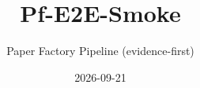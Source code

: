 \documentclass[11pt]{article}
\title{Pf-E2E-Smoke}
\author{Paper Factory Pipeline (evidence-first)}
\date{2026-09-21}
\begin{document}
\maketitle
\begin{abstract}

\end{abstract}






\end{document}
